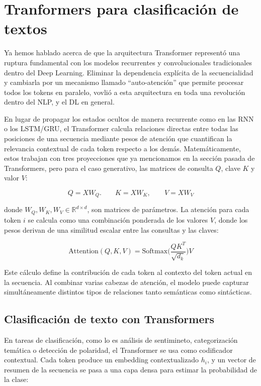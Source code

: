 \section*{Tranformers para clasificación de textos}

Ya hemos hablado acerca de que la arquitectura Transformer representó una ruptura fundamental con
los modelos recurrentes y convolucionales tradicionales dentro del Deep Learning. Eliminar la 
dependencia explícita de la secuencialidad y cambiarla por un mecanismo llamado ``auto-atención'' que
permite procesar todos los tokens en paralelo, vovlió a esta arquitectura en toda una revolución dentro
del NLP, y el DL en general. 

En lugar de propagar los estados ocultos de manera recurrente como en las RNN o los LSTM/GRU, el 
Transformer calcula relaciones directas entre todas las posiciones de una secuencia mediante pesos 
de atención que cuantifican la relevancia contextual de cada token respecto a los demás. Matemáticamente, 
estos trabajan con tres proyecciones que ya mencionamos en la sección pasada de Transformers, pero
para el caso generativo, las matrices de consulta $Q$, clave $K$ y valor $V$:

\[
    Q = XW_Q. \;\;\;\;\;\;\; K = XW_K, \;\;\;\;\;\;\; V = XW_V
\]

donde $W_Q, W_K, W_V \in \mathbb{R}^{d \times d}$, son matrices de parámetros. La atención para cada
token $i$ se calcula como una combinación ponderada de los valores $V$, donde los pesos derivan de
una similitud escalar entre las consultas y las claves:

\[
    \text{Attention}(Q,K,V) = \text{Softmax} \Big(\frac{QK^T}{\sqrt{d_k}}\Big) V
\]

Este cálculo define la contribución de cada token al contexto del token actual en la secuencia. Al 
combinar varias cabezas de atención, el modelo puede capturar simultáneamente distintos tipos de relaciones
tanto semánticas como sintácticas. 

\subsection{Clasificación de texto con Transformers}

En tareas de clasificación, como lo es análisis de sentimineto, categorización temática o detección
de polaridad, el Transformer se usa como codificador contextual. Cada token produce un embedding contextualizado
$h_i$, y un vector de resumen de la secuencia se pasa a una capa densa para estimar la probabilidad 
de la clase:

